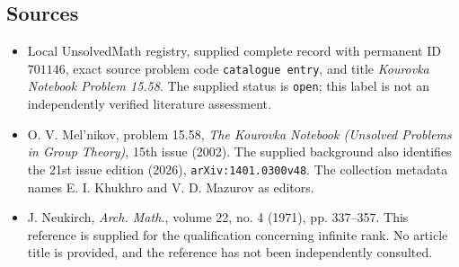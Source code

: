 \documentclass[11pt]{article}
\begin{document}
\subsection{Sources}
\begin{itemize}
\item Local UnsolvedMath registry, supplied complete record with permanent ID \(701146\), exact source problem code \texttt{catalogue entry}, and title \emph{Kourovka Notebook Problem 15.58}. The supplied status is \texttt{open}; this label is not an independently verified literature assessment.
\item O. V. Mel'nikov, problem 15.58, \emph{The Kourovka Notebook (Unsolved Problems in Group Theory)}, 15th issue (2002). The supplied background also identifies the 21st issue edition (2026), \texttt{arXiv:1401.0300v48}. The collection metadata names E. I. Khukhro and V. D. Mazurov as editors.
\item J. Neukirch, \emph{Arch. Math.}, volume 22, no. 4 (1971), pp. 337--357. This reference is supplied for the qualification concerning infinite rank. No article title is provided, and the reference has not been independently consulted.
\end{itemize}
\end{document}
